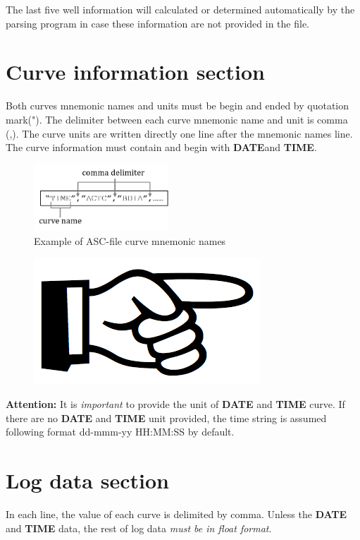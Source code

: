 \documentclass[12pt,a4paper,oneside]{report}
\begin{document}
\begin{appendices}
\noindent The last five well information will calculated or determined automatically by the parsing program in case these information are not provided in the file. 


\section{Curve information section}
Both curves mnemonic names and units must be begin and ended by quotation mark("). The delimiter between each curve mnemonic name and unit is comma (,). The curve units are written directly one line after the mnemonic names line. The curve information must contain and begin with \textbf{DATE}and \textbf{TIME}.
\begin{figure}[ht]
\centering
\includegraphics[width=0.45\textwidth]{asc_curve_info_1.png}
\caption{Example of ASC-file curve mnemonic names}
\end{figure}

\begin{figure}
\vspace{-15pt}
\includegraphics[scale=0.08]{hand_point.png}
\end{figure}
\noindent\textbf{Attention:} It is \emph{important} to provide the unit of \textbf{DATE} and \textbf{TIME} curve. If there are no \textbf{DATE} and \textbf{TIME} unit provided, the time string is assumed following format {\color{violet}dd-mmm-yy HH:MM:SS} by default.


\section{Log data section}
In each line, the value of each curve is delimited by comma. Unless the \textbf{DATE} and \textbf{TIME} data, the rest of log data \emph{must be in float format}.


\end{appendices}
\end{document}
